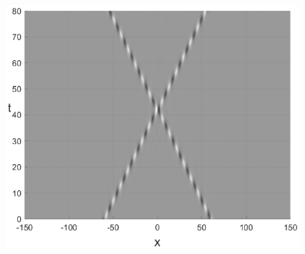 \documentclass[preprint,12pt]{elsarticle}
\begin{document}
\begin{figure}[H]
\begin{minipage}[h]{0.32\linewidth}
\end{minipage}
\begin{minipage}[h]{0.32\linewidth}
\includegraphics[width=1\linewidth]{fig58g.eps}
\end{minipage}


\end{figure}
\end{document}
